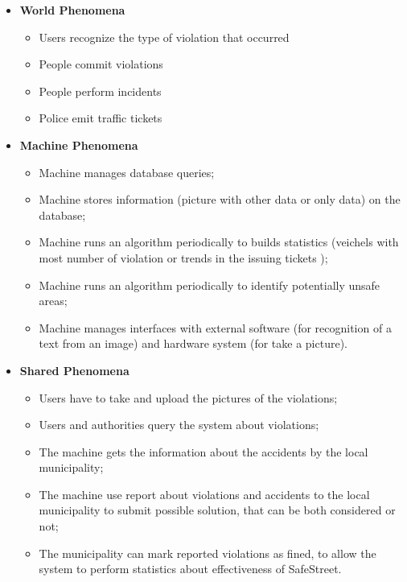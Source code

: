 \documentclass[a4paper, hidelinks, 12pt]{report}
\begin{document}
            \begin{itemize}
                \item \textbf{World Phenomena}
                \begin{itemize}
                    \item Users recognize the type of violation that occurred
                    \item People commit violations
                    \item People perform incidents
                    \item Police emit traffic tickets
                \end{itemize}
                \item \textbf{Machine Phenomena}
                \begin{itemize}
                    \item Machine manages database queries;
                    \item Machine stores information (picture with other data or only data) on the database;
                    \item Machine runs an algorithm periodically to builds statistics (veichels with most number of violation or trends in the issuing tickets );
                    \item Machine runs an algorithm periodically to identify potentially unsafe areas;
                    \item Machine manages interfaces with external software (for recognition of a text from an image) and hardware system (for take a picture).
                \end{itemize}
                \item \textbf{Shared Phenomena}
                \begin{itemize}
                    \item Users have to take and upload the pictures of the violations;
                    \item Users and authorities query the system about violations;
                    \item The machine gets the information about the accidents by the local municipality;
                    \item The machine use report about violations and accidents to the local municipality to submit possible solution, that can be both considered or not;
                    \item The municipality can mark reported violations as fined, to allow the system to perform statistics about effectiveness of SafeStreet.
                \end{itemize}
            \end{itemize}
\end{document}
